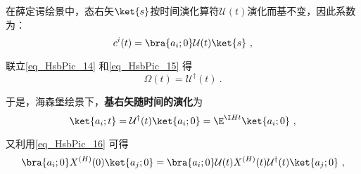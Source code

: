 在薛定谔绘景中，态右矢$\ket{s}$按时间演化算符$\mathcal{U}(t)$演化而基不变，因此系数为：
\begin{equation}\label{eq_HsbPic_15}
c^i(t) = \bra{a_i; 0}\mathcal{U}(t)\ket{s}~,
\end{equation}

联立\autoref{eq_HsbPic_14} 和\autoref{eq_HsbPic_15} 得
\begin{equation}
\mathcal{\Omega}(t)=\mathcal{U}^\dagger(t)~.
\end{equation}








于是，海森堡绘景下，\textbf{基右矢随时间的演化}为
\begin{equation}\label{eq_HsbPic_3}
\ket{a_i; t} = \mathcal{U}^\dagger(t)\ket{a_i; 0} = \E^{\I H t}\ket{a_i; 0}~,
\end{equation}

又利用\autoref{eq_HsbPic_16} 可得
\begin{equation}
\bra{a_i; 0}X^{(H)}(0)\ket{a_j; 0} = \bra{a_i; 0}\mathcal{U}(t)X^{(H)}(t)\mathcal{U}^\dagger(t)\ket{a_j; 0}~,
\end{equation}

